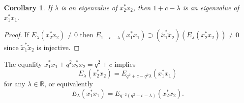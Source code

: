 \documentclass[11pt]{article}
\numberwithin{equation}{section}
\newtheorem{corollary}{Corollary}
\begin{document}
\begin{corollary}\label{eigenvalue} If $\lambda$ is an eigenvalue of $x_{2}^{\ast}x_{2}$,
then $1+c-\lambda$ is an eigenvalue of $x_{1}^{\ast}x_{1}$.
\end{corollary}
\begin{proof} If $E_{\lambda}( x_{2}^{\ast}x_{2}) \neq0$ then
$E_{1+c-\lambda}( x_{1}^{\ast}x_{1}) \supset( \tilde{x}%
_{1}^{\ast}\tilde{x}_{2}) ( E_{\lambda}( x_{2}^{\ast}%
x_{2}) ) \neq0$ since $\tilde{x}_{1}^{\ast}\tilde{x}_{2}$ is injective.
\end{proof}

The equality $x_{1}^{\ast}x_{1}+q^{2}x_{2}^{\ast}x_{2}=q^{2}+c$ implies
\[
E_{\lambda}( x_{2}^{\ast}x_{2}) =E_{q^{2}+c-q^{2}\lambda}(
x_{1}^{\ast}x_{1})
\]
for any $\lambda\in\mathbb{R}$, or equivalently
\[
E_{\lambda}( x_{1}^{\ast}x_{1}) =E_{q^{-2}( q^{2}%
+c-\lambda) }( x_{2}^{\ast}x_{2}) .
\]
\end{document}
